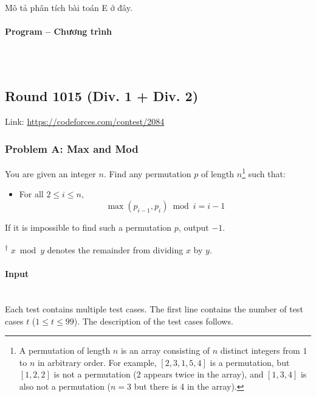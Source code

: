 \documentclass{article}
\begin{document}
Mô tả phân tích bài toán E ở đây.

\paragraph{Program -- Chương trình} \mbox{} \\

\begin{lstlisting} 

\end{lstlisting}

\subsection{Round 1015 (Div. 1 + Div. 2)}

Link: \url{https://codeforces.com/contest/2084}

\subsubsection{Problem A: Max and Mod}

You are given an integer $n$. Find any permutation $p$ of length $n$\footnote{A permutation of length $n$ is an array consisting of $n$ distinct integers from $1$ to $n$ in arbitrary order. For example, $[2,3,1,5,4]$ is a permutation, but $[1,2,2]$ is not a permutation (2 appears twice in the array), and $[1,3,4]$ is also not a permutation ($n = 3$ but there is 4 in the array).} such that:

\begin{itemize}
    \item For all $2 \le i \le n$, 
    \[
        \max(p_{i-1}, p_i) \bmod i = i - 1
    \]
\end{itemize}

If it is impossible to find such a permutation $p$, output $-1$.

\textsuperscript{$\dagger$} $x \bmod y$ denotes the remainder from dividing $x$ by $y$.


\paragraph{Input} \mbox{} \\

Each test contains multiple test cases. The first line contains the number of test cases $t$ ($1 \le t \le 99$). The description of the test cases follows.\\
\end{document}
